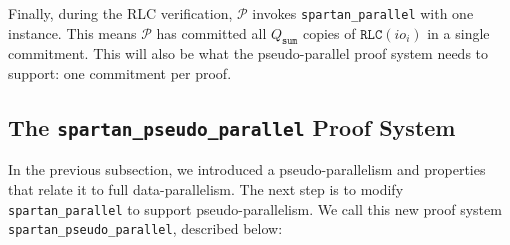 \documentclass{article}
\newcommand{\code}{\texttt}
\newcommand{\Qsum}{Q_{\mathtt{sum}}}
\renewcommand{\P}{\mathcal{P}}
\newcommand{\RLC}{\mathtt{RLC}}
\begin{document}
Finally, during the RLC verification, $\P$ invokes \code{spartan\_parallel} with one instance. This means $\P$ has committed all $\Qsum$ copies of $\RLC(io_i)$ in a single commitment. This will also be what the pseudo-parallel proof system needs to support: one commitment per proof.

\subsection{The \code{spartan\_pseudo\_parallel} Proof System}

In the previous subsection, we introduced a pseudo-parallelism and properties that relate it to full data-parallelism. The next step is to modify \code{spartan\_parallel} to support pseudo-parallelism. We call this new proof system \code{spartan\_pseudo\_parallel}, described below:
\end{document}
